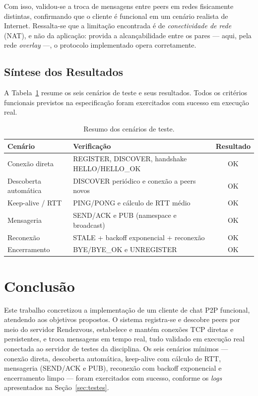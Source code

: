 \documentclass[12pt, a4paper]{article}
\begin{document}
Com isso, validou-se a troca de mensagens entre peers em redes fisicamente distintas, confirmando que o cliente é funcional em um cenário realista de Internet. Ressalta-se que a limitação encontrada é de \textit{conectividade de rede} (NAT), e não da aplicação: provida a alcançabilidade entre os pares --- aqui, pela rede \textit{overlay} ---, o protocolo implementado opera corretamente.

\subsection{Síntese dos Resultados}
A Tabela~\ref{tab:resultados} resume os seis cenários de teste e seus resultados. Todos os critérios funcionais previstos na especificação foram exercitados com sucesso em execução real.

\begin{table}[h]
\centering
\caption{Resumo dos cenários de teste.}
\label{tab:resultados}
\begin{tabular}{|l|p{7.5cm}|c|}
\hline
\textbf{Cenário} & \textbf{Verificação} & \textbf{Resultado} \\
\hline
Conexão direta & REGISTER, DISCOVER, handshake HELLO/HELLO\_OK & OK \\
\hline
Descoberta automática & DISCOVER periódico e conexão a peers novos & OK \\
\hline
Keep-alive / RTT & PING/PONG e cálculo de RTT médio & OK \\
\hline
Mensageria & SEND/ACK e PUB (namespace e broadcast) & OK \\
\hline
Reconexão & STALE + backoff exponencial + reconexão & OK \\
\hline
Encerramento & BYE/BYE\_OK e UNREGISTER & OK \\
\hline
\end{tabular}
\end{table}

\section{Conclusão}
Este trabalho concretizou a implementação de um cliente de chat P2P funcional, atendendo aos objetivos propostos. O sistema registra-se e descobre peers por meio do servidor Rendezvous, estabelece e mantém conexões TCP diretas e persistentes, e troca mensagens em tempo real, tudo validado em execução real conectada ao servidor de testes da disciplina. Os seis cenários mínimos --- conexão direta, descoberta automática, keep-alive com cálculo de RTT, mensageria (SEND/ACK e PUB), reconexão com backoff exponencial e encerramento limpo --- foram exercitados com sucesso, conforme os \textit{logs} apresentados na Seção~\ref{sec:testes}.
\end{document}
